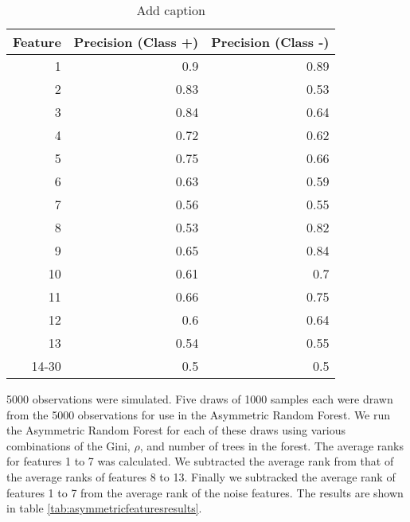 \begin{table}[htbp]
  \centering
  \caption{Add caption}
    \begin{tabular}{rrr}
    \hline
    Feature & Precision (Class +) & Precision (Class -) \bigstrut\\
    \hline
    1     & 0.9   & 0.89 \bigstrut[t]\\
    2     & 0.83  & 0.53 \\
    3     & 0.84  & 0.64 \\
    4     & 0.72  & 0.62 \\
    5     & 0.75  & 0.66 \\
    6     & 0.63  & 0.59 \\
    7     & 0.56  & 0.55 \\
    8     & 0.53  & 0.82 \\
    9     & 0.65  & 0.84 \\
    10    & 0.61  & 0.7 \\
    11    & 0.66  & 0.75 \\
    12    & 0.6   & 0.64 \\
    13    & 0.54  & 0.55 \\
    14-30 & 0.5   & 0.5 \bigstrut[b]\\
    \hline
    \end{tabular}%
  \label{tab:asymmetricfeatures1}%
\end{table}%

5000 observations were simulated. Five draws of 1000 samples each were drawn from the 5000 observations for use in the Asymmetric Random Forest. We run the Asymmetric Random Forest for each of these draws using various combinations of the Gini, $\rho$, and number of trees in the forest. The average ranks for features 1 to 7 was calculated. We subtracted the average rank from that of the average ranks of features 8 to 13. Finally we subtracked the average rank of features 1 to 7 from the average rank of the noise features. The results are shown in table \ref{tab:asymmetricfeaturesresults}.




